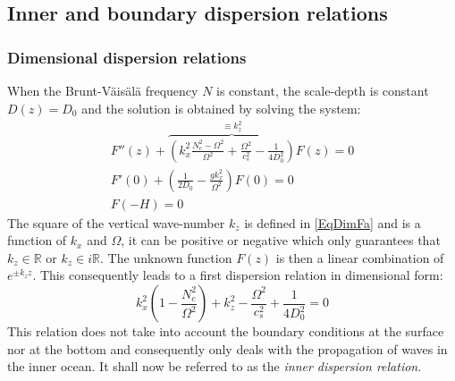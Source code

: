\documentclass[a4paper,11pt]{article}
\begin{document}
\subsection{Inner and boundary dispersion relations}
 \label{SubSectionDisp}
 
 \subsubsection{Dimensional dispersion relations}
When the Brunt-V\"ais\"al\"a frequency $N$ is constant, the scale-depth is constant $D(z)=D_0$ and the solution is obtained by solving the system:
\begin{subequations}
	\label{EqDimF}
	\begin{alignat}{2}	
    \displaystyle
	\label{EqDimFa}
    F''(z)
    +
   \overbrace{ \left(k_x^2\frac{N_c^2-\Omega^2}{\Omega^2}
   +\frac{\Omega^2}{c_s^2}-\frac{1}{4D_0^2}\right)}^{\equiv k_z^2}
    F(z)=0\\[4mm]
	\label{EqDimFb}
    \displaystyle
    F'(0)+\left(
    \frac{1}{2 D_0}-\frac{gk_x^2}{\Omega^2}
    \right) F(0)=0\\[4mm]
	\label{EqDimFc}
    \displaystyle
    F(-H)=0
  \end{alignat}
\end{subequations}
The square of the vertical wave-number $k_z$ is defined in \ref{EqDimFa} and is a function of $k_x$ and $\Omega$, it can be positive or negative which only guarantees that $k_z \in \mathbb{R}$ or $k_z \in i\mathbb{R}$. The unknown function $F(z)$ is then a linear combination of $e^{\pm k_z z}$. This consequently leads to a first dispersion relation in dimensional form:
\begin{equation}
  \label{EqDispRefInner}
  \displaystyle
   k_x^2\left(1-\frac{N_c^2}{\Omega^2}\right)+k_z^2
   -\frac{\Omega^2}{c_s^2}+\frac{1}{4D_0^2}=0
\end{equation}
This relation does not take into account the boundary conditions at the surface nor at the bottom and consequently only deals with the propagation of waves in the inner ocean. It shall now be referred to as the \textit{inner dispersion relation}.\\
\end{document}
